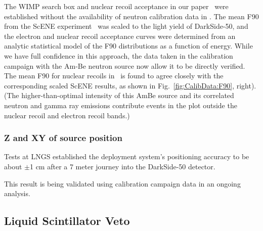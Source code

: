 
The WIMP search box and nuclear recoil acceptance in our paper~\cite{ds:ds-50-PLB} were established
without the availability of neutron calibration data in \dsf.  
The mean F90 from the ScENE experiment~\cite{scene2} was scaled to the light yield of DarkSide-50, and the electron and nuclear recoil acceptance curves were determined from an analytic statistical model of the F90 distributions as a function of energy. While we have full confidence in this approach, the 
data taken in the calibration campaign with the Am-Be neutron source now allow it to be directly
verified.  The mean F90 for nuclear recoils in \dsf\ is found to agree closely with the corresponding
scaled ScENE results, as shown in Fig.~\ref{fig:CalibData:F90}, right). 
(The higher-than-optimal intensity of this AmBe source and its 
correlated neutron and gamma ray emissions contribute events in the plot outside the nuclear recoil and electron recoil bands.)

\subsubsection{Z and XY of source position}
Tests at LNGS established the deployment system's positioning accuracy to be about $\pm$1 cm after a 7 meter journey into the DarkSide-50 detector.



This result is being validated using calibration campaign data in an ongoing analysis. 


\subsection{Liquid Scintillator Veto}\label{sec:LSV:gammasources}


